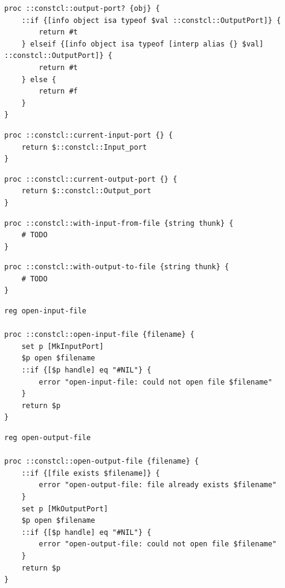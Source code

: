 \documentclass[twoside,9pt]{report}
\begin{document}
\noindent\makebox[\linewidth]{\rule{\linewidth}{0.4pt}}
\noindent\makebox[\linewidth]{\rule{\linewidth}{0.4pt}}
\begin{lstlisting}
proc ::constcl::output-port? {obj} {
    ::if {[info object isa typeof $val ::constcl::OutputPort]} {
        return #t
    } elseif {[info object isa typeof [interp alias {} $val] ::constcl::OutputPort]} {
        return #t
    } else {
        return #f
    }
}
\end{lstlisting}
\noindent\makebox[\linewidth]{\rule{\linewidth}{0.4pt}}
\noindent\makebox[\linewidth]{\rule{\linewidth}{0.4pt}}
\begin{lstlisting}
proc ::constcl::current-input-port {} {
    return $::constcl::Input_port
}
\end{lstlisting}
\noindent\makebox[\linewidth]{\rule{\linewidth}{0.4pt}}
\noindent\makebox[\linewidth]{\rule{\linewidth}{0.4pt}}
\begin{lstlisting}
proc ::constcl::current-output-port {} {
    return $::constcl::Output_port
}
\end{lstlisting}
\noindent\makebox[\linewidth]{\rule{\linewidth}{0.4pt}}
\noindent\makebox[\linewidth]{\rule{\linewidth}{0.4pt}}
\begin{lstlisting}
proc ::constcl::with-input-from-file {string thunk} {
    # TODO
}
\end{lstlisting}
\noindent\makebox[\linewidth]{\rule{\linewidth}{0.4pt}}
\noindent\makebox[\linewidth]{\rule{\linewidth}{0.4pt}}
\begin{lstlisting}
proc ::constcl::with-output-to-file {string thunk} {
    # TODO
}
\end{lstlisting}
\noindent\makebox[\linewidth]{\rule{\linewidth}{0.4pt}}
\noindent\makebox[\linewidth]{\rule{\linewidth}{0.4pt}}
\begin{lstlisting}
reg open-input-file
 
proc ::constcl::open-input-file {filename} {
    set p [MkInputPort]
    $p open $filename
    ::if {[$p handle] eq "#NIL"} {
        error "open-input-file: could not open file $filename"
    }
    return $p
}
\end{lstlisting}
\noindent\makebox[\linewidth]{\rule{\linewidth}{0.4pt}}
\noindent\makebox[\linewidth]{\rule{\linewidth}{0.4pt}}
\begin{lstlisting}
reg open-output-file
 
proc ::constcl::open-output-file {filename} {
    ::if {[file exists $filename]} {
        error "open-output-file: file already exists $filename"
    }
    set p [MkOutputPort]
    $p open $filename
    ::if {[$p handle] eq "#NIL"} {
        error "open-output-file: could not open file $filename"
    }
    return $p
}
\end{lstlisting}
\end{document}
